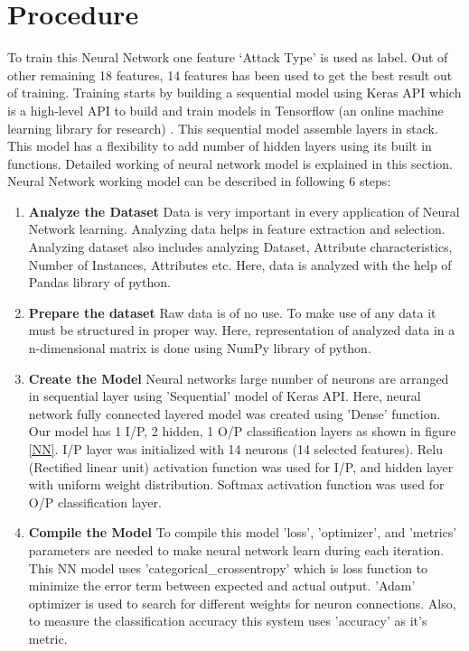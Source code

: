 \section{Procedure} \label{Procedure}
 To train this Neural Network one feature ‘Attack Type’ is used as label. Out of other remaining 18 features, 14 features has been used to get the best result out of training. Training starts by building a sequential model using Keras API which is a high-level API to build and train models in Tensorflow (an online machine learning library for research) . This sequential model assemble layers in stack. This model has a flexibility to add number of hidden layers using its built in functions. Detailed working of neural network model is explained in this section.
Neural Network working model can be described in following 6 steps:
\begin{enumerate}[label=\textbf{\roman*}]
\item \textbf{Analyze the Dataset } Data is very important in every application of Neural Network learning. Analyzing data helps in feature extraction and selection. Analyzing dataset also includes analyzing Dataset, Attribute characteristics, Number of Instances, Attributes etc. Here, data is analyzed with the help of Pandas library of python. 
\item \textbf{Prepare the dataset } Raw data is of no use. To make use of any data it must be structured in proper way. Here, representation of analyzed data in a n-dimensional matrix is done using NumPy library of python.

\item \textbf{Create the Model } Neural networks large number of neurons are arranged in sequential layer using 'Sequential' model of Keras API. Here, neural network fully connected layered model was created using 'Dense' function. Our model has 1 I/P, 2 hidden, 1 O/P classification layers as shown in figure \ref{NN}. I/P layer was initialized with 14 neurons (14 selected features). Relu (Rectified linear unit) activation function was used for I/P, and hidden layer with uniform weight distribution. Softmax activation function was used for O/P classification layer.

\item \textbf{Compile the Model } To compile this model 'loss', 'optimizer', and 'metrics' parameters are needed to make neural network learn during each iteration. This NN model uses 'categorical\_crossentropy' which is loss function to minimize the error term between expected and actual output. 'Adam' optimizer is used to search for different weights for neuron connections. Also, to measure the classification accuracy this system uses 'accuracy' as it's metric. 


\end{enumerate}
